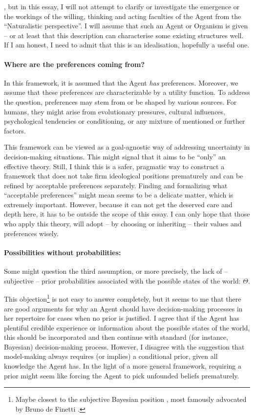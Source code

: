 \documentclass{article}
\begin{document}
, but in this essay, I will not attempt to clarify or investigate the emergence or the workings of the willing, thinking and acting faculties of the Agent from the ``Naturalistic perspective''. I will assume that such an Agent or Organism is given -- or at least that this description can characterise some existing structures well. If I am honest, I need to admit that this is an idealisation, hopefully a useful one.

\paragraph{Where are the preferences coming from?} In this framework, it is assumed that the Agent \emph{has} preferences. Moreover, we assume that these preferences are characterizable by a utility function. To address the question, preferences may stem from or be shaped by various sources. For humans, they might arise from evolutionary pressures, cultural influences, psychological tendencies or conditioning, or any mixture of mentioned or further factors.

This framework can be viewed as a goal-agnostic way of addressing uncertainty in decision-making situations. This might signal that it aims to be ``only'' an effective theory. Still, I think this is a safer, pragmatic way to construct a framework that does not take firm ideological positions prematurely and can be refined by acceptable preferences separately. Finding and formalizing what ``acceptable preferences'' might mean seems to be a delicate matter,  which is extremely important. However, because it can not get the deserved care and depth here, it has to be 
outside the scope of this essay.
I can only hope that those who apply this theory, will adopt -- by choosing or inheriting -- their values and preferences wisely.

\paragraph{Possibilities without probabilities:}
Some might question the third assumption, or more precisely, the lack of – subjective – prior probabilities associated with the possible states of the world: $\Theta$. 

This objection\footnote{Maybe closest to the subjective Bayesian position \cite{sep:BayesianEpistemology}, most famously advocated by Bruno de Finetti \cite{book:deFinetti}.} is not easy to answer completely, but it seems to me that there are good arguments for why an Agent should have decision-making processes in her repertoire for cases when no prior is justified.
I agree that if the Agent has plentiful credible experience or information about the possible states of the world, this should be incorporated and then continue with standard (for instance, Bayesian) decision-making process.
However, I disagree with the suggestion that model-making always requires (or implies) a conditional prior, given all knowledge the Agent has. In the light of a more general framework, requiring a prior might seem like forcing the Agent to pick unfounded beliefs prematurely.
\end{document}
